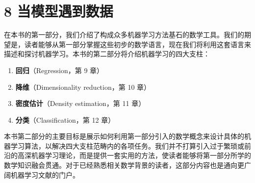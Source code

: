 \chapter{8 当模型遇到数据}

在本书的第一部分，我们介绍了构成众多机器学习方法基石的数学工具。我们的期望是，读者能够从第一部分掌握这些初步的数学语言，现在我们将利用这套语言来描述和探讨机器学习。本书的第二部分将介绍机器学习的四大支柱：

\begin{enumerate}
\item \textbf{回归}（Regression，第 9 章）
\item \textbf{降维}（Dimensionality reduction，第 10 章）
\item \textbf{密度估计}（Density estimation，第 11 章）
\item \textbf{分类}（Classification，第 12 章）
\end{enumerate}

本书第二部分的主要目标是展示如何利用第一部分引入的数学概念来设计具体的机器学习算法，以解决四大支柱范畴内的各项任务。我们并不打算引入过于繁琐或前沿的高深机器学习理论，而是提供一套实用的方法，使读者能够将第一部分所学的数学知识融会贯通。对于已经熟悉相关数学背景的读者，这部分内容也是通向更广阔机器学习文献的门户。
